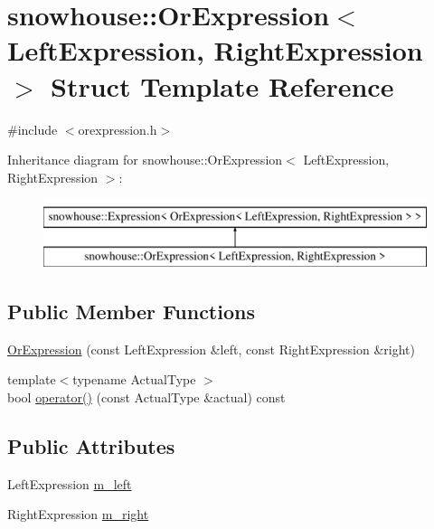 \hypertarget{structsnowhouse_1_1OrExpression}{}\section{snowhouse\+::Or\+Expression$<$ Left\+Expression, Right\+Expression $>$ Struct Template Reference}
\label{structsnowhouse_1_1OrExpression}


{\ttfamily \#include $<$orexpression.\+h$>$}

Inheritance diagram for snowhouse\+::Or\+Expression$<$ Left\+Expression, Right\+Expression $>$\+:\begin{figure}[H]
\begin{center}
\leavevmode
\includegraphics[height=2.000000cm]{structsnowhouse_1_1OrExpression}
\end{center}
\end{figure}
\subsection*{Public Member Functions}
\begin{DoxyCompactItemize}
\item 
\mbox{\hyperlink{structsnowhouse_1_1OrExpression_a25bc03ea7c203e83d638eec5dc4f128e}{Or\+Expression}} (const Left\+Expression \&left, const Right\+Expression \&right)
\item 
{\footnotesize template$<$typename Actual\+Type $>$ }\\bool \mbox{\hyperlink{structsnowhouse_1_1OrExpression_a78df18f570ec5cf2fda3b192056d4bad}{operator()}} (const Actual\+Type \&actual) const
\end{DoxyCompactItemize}
\subsection*{Public Attributes}
\begin{DoxyCompactItemize}
\item 
Left\+Expression \mbox{\hyperlink{structsnowhouse_1_1OrExpression_a467eee87a951c2d86ec852e12e46eb96}{m\+\_\+left}}
\item 
Right\+Expression \mbox{\hyperlink{structsnowhouse_1_1OrExpression_a7919c7808213c4ab6c5f09672fee2d87}{m\+\_\+right}}
\end{DoxyCompactItemize}


